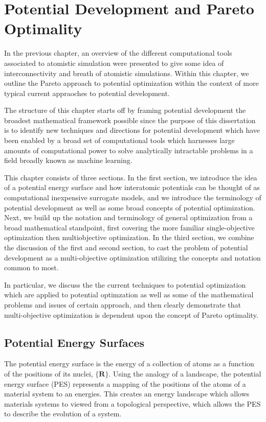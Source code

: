 \chapter{Potential Development and Pareto Optimality}

In the previous chapter, an overview of the different computational tools associated to atomistic simulation were presented to give some idea of interconnectivity and breath of atomistic simulations.  Within this chapter, we outline the Pareto approach to potential optimization within the context of more typical current appraoches to potential development.

The structure of this chapter starts off by framing potential development the broadest mathematical framework possible since the purpose of this dissertation is to identify new techniques and directions for potential development which have been enabled by a broad set of computational tools which harnesses large amounts of computational power to solve analytically intractable problems in a field broadly known as machine learning.

This chapter consists of three sections.  In the first section, we introduce the idea of a potential energy surface and how interatomic potentials can be thought of as computational inexpensive surrogate models, and we introduce the terminology of potential development as well as some broad concepts of potential optimization.
Next, we build up the notation and terminology of general optimization from a broad mathematical standpoint, first covering the more familiar single-objective optimization then multiobjective optimization.
In the third section, we combine the discussion of the first and second section, to cast the problem of potential development as a multi-objective optimization utilizing the concepts and notation common to most.

In particular, we discuss the the current techniques to potential optimization which are applied to potential optimzation as well as some of the mathematical problems and issues of certain approach, and then clearly demonstrate that multi-objective optimization is dependent upon the concept of Pareto optimality.

\section{Potential Energy Surfaces}

The potential energy surface is the energy of a collection of atoms as a function of the positions of its nuclei, $\{\bm{R}\}$.
Using the analogy of a landscape, the potential energy surface (PES) represents a mapping of the positions of the atoms of a material system to an energies.
This creates an energy landscape which allows materials systems to viewed from a topological perspective, which allows the PES to describe the evolution of a system.

